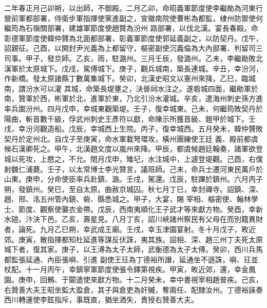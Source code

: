 \begin{pinyinscope}
 二年春正月己卯朔，以出師，不御殿。二月乙卯，命昭義軍節度使李繼勛為河東行營前軍都部署，侍衛步軍指揮使黨進副之，宣徽南院使曹彬為都監，棣州防禦使何繼筠為石嶺關部署，建雄軍節度使趙贊為汾州
 路部署，以伐北漢。宴長春殿。命彰德軍節度使韓仲贇為北面都部署，彰義軍節度使郭延義副之，以防契丹。戊午，詔親征。己酉，以開封尹光義為上都留守，樞密副使沉義倫為大內部署、判留司三司事。甲子，發京師。乙亥，雨，駐潞州。三月壬辰，發潞州。乙未，李繼勛敗北漢軍於太原城下。戊戌，駕傅城下。庚子，觀兵城南，築長連城。辛丑，幸汾河，作新橋。發太原諸縣丁數萬集城下。癸卯，北漢史昭文以憲州來降，乙巳，臨城南，謂汾水可以灌
 其城，命築長堤壅之，決晉祠水注之。遂砦城四面，繼勛軍於南，贊軍於西，彬軍於北，進軍於東，乃北引汾水灌城。辛亥，遣海州刺史孫方進率兵圍汾州。四月戊申，幸城東觀築堤。壬子，復幸城東。己未，何繼筠敗契丹於陽曲，斬首數千級，俘武州刺史王彥符以獻，命陳示所獲首級、鎧甲於城下。壬戌，幸汾河觀造船。戊辰，幸城西上生院。丙子，復幸城西。五月癸未，韓仲贇敗契丹於定州北。自戊子至庚寅，命水軍載弩環攻，橫州團練使王廷
 義、殿前都虞候石漢卿死之。甲午，北漢趙文度以嵐州來降。甲辰，都虞候趙廷翰奏，諸軍欲登城以死攻，上愍之，不允。閏月戊申，雉圮，水注城中，上遽登堤觀。己酉，右僕射魏仁浦薨。壬子，以太常博士李光贊言，議班師。己未，命兵士遷河東民萬戶於山東。庚申，分命使臣率兵赴鎮、潞。壬戌，駕還。戊辰，駐蹕於鎮州。六月丙子朔，發鎮州。癸巳，至自太原。曲赦京城囚。秋七月丁巳，幸封禪寺。詔鎮、深、趙、邢、洺五州管內鎮、砦、縣悉城之。甲子，大宴，賜
 宰相、樞密使、翰林學士、節度、觀察使襲衣金帶。戊辰，西南夷順化王子武才等來獻方物。癸酉，幸新水磑。汴決下邑。乙亥，壽星見。八月丁亥，詔川峽諸州察民有父母在而別籍異財者，論死。九月乙巳朔，幸武成王廟。壬戌，幸玉津園宴射。冬十月戊子，畋近郊。庚寅，散指揮都知杜延進等謀反伏誅，夷其族。詔相、深、趙三州丁夫死太原城下者，復其家。庚子，以王溥為太子太師，武衡德為太子太傅。癸卯，西川兵馬都監張延通、內臣張嶼、引進
 副使王玨為丁德裕所譖，延通坐不遜誅，嶼、玨並杖配。十一月丙午，幸鎮寧軍節度使張令鐸第視疾。甲寅，畋近郊，還，幸金鳳園。庚申，回鶻、于闐遣使來獻方物。十二月癸未，幸中書視宰相趙普疾。己亥，右贊善大夫王昭坐監大盈倉，其子與倉吏為奸贓，奪兩任、配隸汝州。丁德裕誣奏西川轉運使李鉉指斥，事既直，猶坐酒失，責授右贊善大夫。




\end{pinyinscope}
